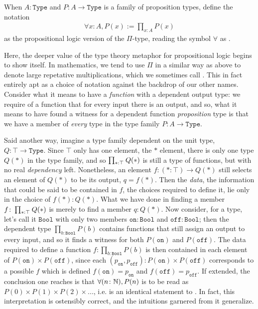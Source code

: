 \documentclass[11pt]{article}
\begin{document}
\begin{notation}
When $A\colon \mathtt{Type}$ and $P\colon A \to \mathtt{Type}$ is a family of proposition types, define the notation \begin{gather*}
\forall x : A, P(x) := \prod_{x : A} P(x)
\end{gather*}
as the propositional logic version of the $\Pi$-type, reading the symbol $\forall$ as . 
\end{notation}

Here, the deeper value of the type theory metaphor for propositional logic begins to show itself. In mathematics, we tend to use $\Pi$ in a similar way as above to denote large repetative multiplications, which we sometimes call . This in fact entirely apt as a choice of notation against the backdrop of our other names. Consider what it means to have a \emph{function} with a dependent output type: we require of a function that for every input there is an output, and so, what it means to have found a witness for a dependent function \emph{proposition} type is that we have a member of \emph{every} type in the type family $P\colon A \to \mathtt{Type}$.

Said another way, imagine a type family dependent on the unit type, $Q \colon \top \to \mathtt{Type}$. Since $\top$ only has one element, the $*$ element, there is only one type $Q(*)$ in the type family, and so $\prod_{* : \top} \hspace{0.05em} Q(*)$ is still a type of functions, but with no real \emph{dependency} left. Nonetheless, an element $f \colon (* : \top) \to Q(*)$ still selects an element of $Q(*)$ to be its output, $q = f(*)$. Then the \emph{data}, the information that could be said to be contained in $f$, the choices required to define it, lie only in the choice of $f(*) \colon Q(*)$. What we have done in finding a member $f \colon \prod_{* : \top} \hspace{0.05em} Q(*)$ is merely to find a member $q \colon Q(*)$. Now consider, for a type, let's call it $\mathtt{Bool}$ with only two members $\mathtt{on}\colon \mathtt{Bool}$ and $\mathtt{off} \colon \mathtt{Bool}$; then the dependent type $\prod_{b : \mathtt{Bool}} P(b)$ contains functions that still assign an output to every input, and so it finds a witness for both $P(\mathtt{on})$ and $P(\mathtt{off})$. The data required to define a function $f \colon \prod_{b : \mathtt{Bool}} P(b)$ is then contained in each element of $P(\mathtt{on}) \times P(\mathtt{off})$, since each $(p_{\mathtt{on}},p_{\mathtt{off}}) \colon P(\mathtt{on}) \times P(\mathtt{off})$ corresponds to a possible $f$ which is defined $f(\mathtt{on}) = p_{\mathtt{on}}$ and $f(\mathtt{off}) =  p_{\mathtt{off}}$. If extended, the conclusion one reaches is that $\forall (n \colon \mathbb{N}), P(n)$ is to be read as $P(0) \times P(1) \times P(2) \times ...$, i.e.  is an identical statement to . In fact, this interpretation is ostensibly correct, and the intuitions garnered from it generalize.
\end{document}
